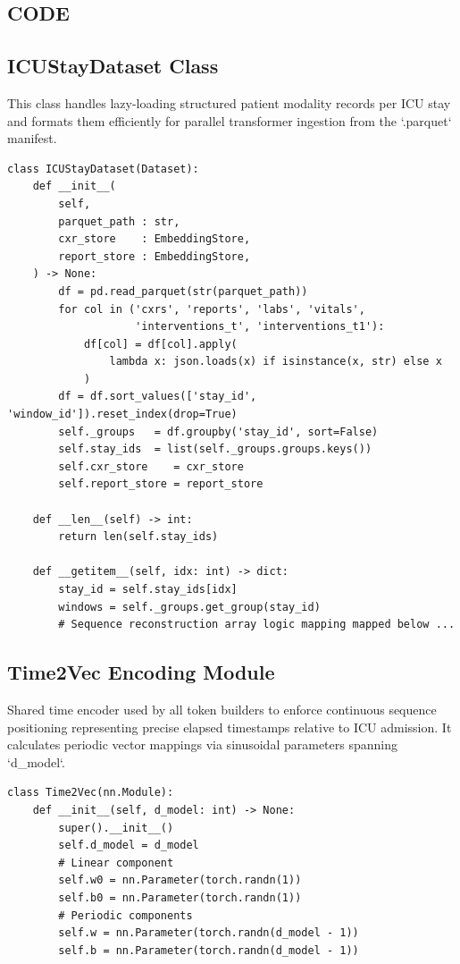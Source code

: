\documentclass{fisatprojectfinal}
\begin{document}
\newpage
{} 
\begin{appendices}
\chapter{CODE}

\section{ICUStayDataset Class}
This class handles lazy-loading structured patient modality records per ICU stay and formats them efficiently for parallel transformer ingestion from the `.parquet` manifest.
\begin{verbatim}
class ICUStayDataset(Dataset):
    def __init__(
        self,
        parquet_path : str,
        cxr_store    : EmbeddingStore,
        report_store : EmbeddingStore,
    ) -> None:
        df = pd.read_parquet(str(parquet_path))
        for col in ('cxrs', 'reports', 'labs', 'vitals',
                    'interventions_t', 'interventions_t1'):
            df[col] = df[col].apply(
                lambda x: json.loads(x) if isinstance(x, str) else x
            )
        df = df.sort_values(['stay_id', 'window_id']).reset_index(drop=True)
        self._groups   = df.groupby('stay_id', sort=False)
        self.stay_ids  = list(self._groups.groups.keys())
        self.cxr_store    = cxr_store
        self.report_store = report_store

    def __len__(self) -> int:
        return len(self.stay_ids)

    def __getitem__(self, idx: int) -> dict:
        stay_id = self.stay_ids[idx]
        windows = self._groups.get_group(stay_id)
        # Sequence reconstruction array logic mapping mapped below ...
\end{verbatim}

\section{Time2Vec Encoding Module}
Shared time encoder used by all token builders to enforce continuous sequence positioning representing precise elapsed timestamps relative to ICU admission. It calculates periodic vector mappings via sinusoidal parameters spanning `d_model`.
\begin{verbatim}
class Time2Vec(nn.Module):
    def __init__(self, d_model: int) -> None:
        super().__init__()
        self.d_model = d_model
        # Linear component
        self.w0 = nn.Parameter(torch.randn(1))
        self.b0 = nn.Parameter(torch.randn(1))
        # Periodic components
        self.w = nn.Parameter(torch.randn(d_model - 1))
        self.b = nn.Parameter(torch.randn(d_model - 1))


\end{verbatim}
\end{appendices}
\end{document}
